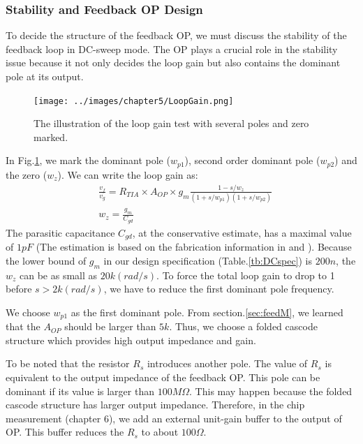 {



\subsubsection{Stability and Feedback OP Design} \label{sec:stabilityandOP}
To decide the structure of the feedback OP, we must discuss the stability of the feedback loop in DC-sweep mode.
The OP plays a crucial role in the stability issue because it not only decides the loop gain but also contains the dominant pole at its output.

\begin{figure}[!htbp]
    \centering
        \texttt{[image: ../images/chapter5/LoopGain.png]}
    \caption{The illustration of the loop gain test with several poles and zero marked.}
    \label{fig:loopgain}
\end{figure}

In Fig.\ref{fig:loopgain}, we mark the dominant pole ($w_{p1}$), second order dominant pole ($w_{p2}$) and the zero ($w_z$).
We can write the loop gain as:
\begin{align}
    & \frac{v_f}{v_g} =  R_{TIA} \times A_{OP} \times g_m \frac{1 - s/w_z}{(1 + s/w_{p1})(1 + s/w_{p2})} \\
    & w_z = \frac{g_m}{C_{gd}}
\end{align}
The parasitic capacitance $C_{gd}$, at the conservative estimate, has a maximal value of $1pF$ (The estimation is based on the fabrication information in \cite{DN17} and \cite{C6}).
Because the lower bound of $g_m$ in our design specification (Table.\ref{tb:DCspec}) is $200n$, the $w_z$ can be as small as $20k (rad/s)$.
To force the total loop gain to drop to 1 before $s > 2k (rad/s)$, we have to reduce the first dominant pole frequency.

We choose $w_{p1}$ as the first dominant pole.
From section.\ref{sec:feedM}, we learned that the $A_{OP}$ should be larger than $5k$.
Thus, we choose a folded cascode structure which provides high output impedance and gain.

To be noted that the resistor $R_s$ introduces another pole.
The value of $R_s$ is equivalent to the output impedance of the feedback OP.
This pole can be dominant if its value is larger than $100M \Omega$.
This may happen because the folded cascode structure has larger output impedance.
Therefore, in the chip measurement (chapter 6), we add an external unit-gain buffer to the output of OP.
This buffer reduces the $R_s$ to about $100 \Omega$.

}
